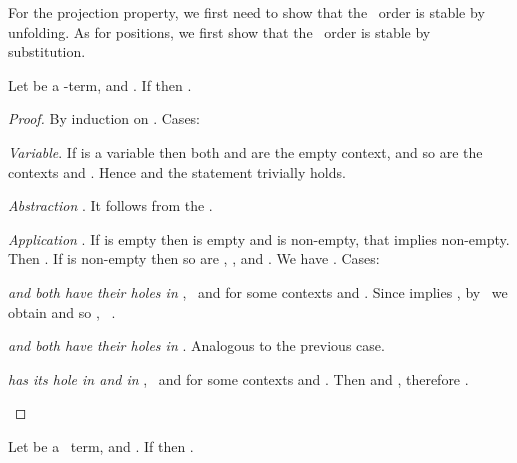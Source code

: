 For the projection property, we first need to show that the \lo\ order is stable by unfolding. As for positions, we first show that the \lo\ order is stable by substitution.

\begin{lemma}
\label{l:ctx-lefttor-sub}
Let  be a -term,  and . If  then .
\end{lemma}

\begin{proof}
	By induction on . Cases:
	\begin{varenumerate}
		\item \emph{Variable}. If  is a variable then both  and  are the empty context, and so are the contexts  and . Hence  and the statement trivially holds.
		\item \emph{Abstraction }. It follows from the \ih.
		\item \emph{Application }. If  is empty then  is empty and  is non-empty, that implies  non-empty. Then . If  is non-empty then so are , , and . We have . Cases:
		\begin{varenumerate}
			\item \emph{ and  both have their holes in }, \ie\  and  for some contexts  and . Since  implies , by \ih\ we obtain  and so , \ie\ .

			\item \emph{ and  both have their holes in }. Analogous to the previous case.
			
			\item \emph{ has its hole in  and  in }, \ie\  and  for some contexts  and . Then  and , therefore .
		\end{varenumerate}
	\end{varenumerate}
\end{proof}


\begin{lemma}
\label{l:lefttor-prop} Let  be a \lsc\ term,  and . If  then .
\end{lemma}


